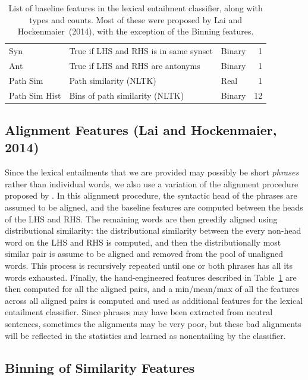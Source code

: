 \begin{table}
\begin{small}
\begin{tabular}{|lllr|}
    Syn & True if LHS and RHS is in same synset & Binary & 1\\
    Ant & True if LHS and RHS are antonyms & Binary & 1\\
    Path Sim & Path similarity (NLTK) & Real & 1\\
    Path Sim Hist & Bins of path similarity (NLTK) & Binary & 12\\
    \hline
\end{tabular}
\caption{List of baseline features in the lexical entailment classifier, along
with types and counts. Most of these were proposed by Lai and Hockenmaier~(2014),
with the exception of the Binning features.}
\label{tab:lexentfeat}
\end{small}
\end{table}

\subsection{Alignment Features (Lai and Hockenmaier, 2014)}
\label{sec:alignment}

Since the lexical entailments that we are provided may possibly be short
{\em phrases} rather than individual words, we also use a variation of the
alignment procedure proposed by . In this alignment
procedure, the syntactic head of the phrases are assumed to be aligned, and
the baseline features are computed between the heads of the LHS and RHS.
The remaining words are then greedily aligned using distributional similarity:
the distributional similarity between the every non-head word on the LHS and
RHS is computed, and then the distributionally most similar pair is assume to
be aligned and removed from the pool of unaligned words. This process is
recursively repeated until one or both phrases has all its words exhausted.
Finally, the hand-engineered features described in Table~\ref{tab:lexentfeat}
are then computed for all the aligned pairs, and a min/mean/max of all the
features across all aligned pairs is computed and used as additional features
for the lexical entailment classifier. Since phrases may have been extracted
from neutral sentences, sometimes the alignments may be very poor, but these
bad alignments will be reflected in the statistics and learned as nonentailing
by the classifier.

\subsection{Binning of Similarity Features}

